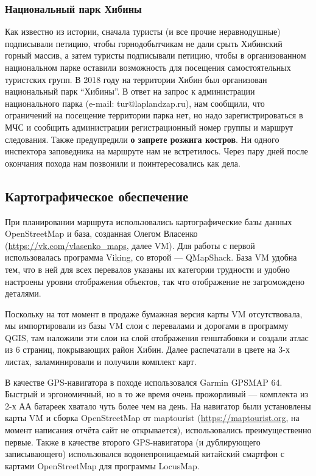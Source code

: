 \subsubsection{Национальный парк Хибины}
Как известно из истории, сначала туристы (и все прочие неравнодушные) подписывали петицию,
чтобы горнодобытчикам не дали срыть Хибинский горный массив, а затем туристы подписывали петицию,
чтобы в организованном национальном парке оставили возможность для посещения самостоятельных туристских групп.
В 2018 году на территории Хибин был организован национальный парк \enquote{Хибины}.
В ответ на запрос к администрации национального парка (\textenglish{e-mail: tur@laplandzap.ru}), нам сообщили,
что ограничений на посещение территории парка нет, но надо зарегистрироваться в МЧС
и сообщить администрации регистрационный номер группы и маршрут следования.
Также предупредили \textbf{\color{red}о запрете розжига костров}. Ни одного инспектора заповедника на маршруте нам не встретилось.
Через пару дней после окончания похода нам позвонили и поинтересовались как дела.

\subsection{Картографическое обеспечение}
При планировании маршрута использовались картографические базы данных \textenglish{OpenStreetMap} и база,
созданная Олегом Власенко (\textenglish{\url{https://vk.com/vlasenko_maps}}, далее \textenglish{VM}).
Для работы с первой использовалась программа \textenglish{Viking},
со второй --- \textenglish{QMapShack}. База \textenglish{VM} удобна тем, что в ней для всех
перевалов указаны их категории трудности
и удобно настроены уровни отображения объектов, так что отображение не загромождено деталями.

Поскольку на тот момент в продаже бумажная версия карты \textenglish{VM} отсутствовала,
мы импортировали из базы \textenglish{VM} слои с перевалами и дорогами в программу \textenglish{QGIS},
там наложили эти слои на слой отображения генштабовки и создали атлас из 6 страниц,
покрывающих район Хибин. Далее распечатали в цвете на 3-х листах, заламинировали и получили комплект карт.

В качестве \textenglish{GPS}-навигатора в походе использовался \textenglish{Garmin GPSMAP 64}.
Быстрый и эргономичный, но в то же время очень прожорливый --- комплекта из 2-х АА батареек хватало чуть более чем на день.
На навигатор были установлены карты \textenglish{VM} и сборка \textenglish{OpenStreetMap}
от \textenglish{maptourist} (\textenglish{\url{https://maptourist.org}}, на момент написания отчёта сайт не открывается),
использовались преимущественно первые. Также в качестве второго \textenglish{GPS}-навигатора (и дублирующего записывающего)
использовался водонепроницаемый китайский смартфон с картами \textenglish{OpenStreetMap} для программы
\textenglish{LocusMap}.


